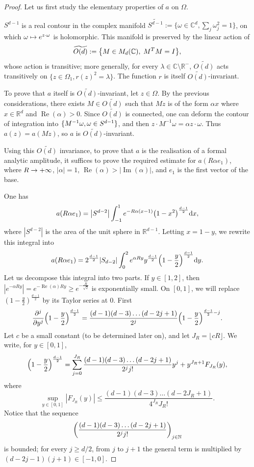 \documentclass[10pt]{amsart}
\theoremstyle{definition}\newtheorem{defi}[theo]{Definition}\newtheorem{rema}[theo]{Remark}\newtheorem{exam}[theo]{Example}\newtheorem{exem}[theo]{Example}\newtheorem{nota}[theo]{Notation}
\DeclareMathOperator{\re}{Re}
\DeclareMathOperator{\im}{Im}
\newcommand\1{\mathds{1}}
\newcommand{\R}{\mathbb{R}}
\newcommand{\C}{\mathbb{C}}
\newcommand{\N}{\mathbb{N}}
\newcommand{\dd}{\mathrm{d}}
\renewcommand*{\to}{\mathchoice{\longrightarrow}{\rightarrow}{\rightarrow}{\rightarrow}}
\let\oldmapsto\mapsto
\renewcommand*{\mapsto}{\mathchoice{\longmapsto}{\oldmapsto}{\oldmapsto}{\oldmapsto}}
\let\originalleft\left
\let\originalright\right
\renewcommand{\left}{\mathopen{}\mathclose\bgroup\originalleft}
\renewcommand{\right}{\aftergroup\egroup\originalright}
\begin{document}
\begin{proof}
Let us first study the elementary properties of $a$ on $\Omega$.

$S^{d-1}$ is a real contour in the complex manifold $\widetilde{S^{d-1}}:=\{\omega\in \C^d,
\sum_j \omega_j^2=1\}$, on which $\omega\mapsto e^{z\cdot \omega}$ is holomorphic. This manifold is preserved by the linear action of
\[
\widetilde{O(d)}:=\left\{M\in M_d(\C),\; M^TM=I\right\},
\]
whose action is transitive; more generally, for every $\lambda\in
\C\setminus \R^-$, $\widetilde{O(d)}$ acts transitively on $\{z\in \Omega_1, r(z)^2=\lambda\}$. The function $r$ is itself $\widetilde{O(d)}$-invariant.


To prove that $a$ itself is $\widetilde{O(d)}$-invariant, let $z\in \Omega$. By the previous considerations, there exists $M\in \widetilde{O(d)}$ such that $Mz$ is of the form $\alpha x$ where $x\in \R^{d}$ and $\re(\alpha)>0$. Since $\widetilde{O(d)}$ is connected, one can deform the contour of integration into $\{M^{-1}\omega,\linebreak \omega\in S^{d-1}\}$, and then $z\cdot M^{-1}\omega=\alpha z\cdot \omega$. Thus $a(z)=a(Mz)$, so $a$ is $\widetilde{O(d)}$-invariant.

Using this $\widetilde{O(d)}$ invariance, to prove that $a$ is the realisation of a formal analytic amplitude, it suffices to prove the required estimate for $a(R\alpha e_1)$, where $R\to +\infty$, $|\alpha|=1$, $\re(\alpha)>\lvert\im(\alpha)|$, and $e_1$ is the first vector of the base.

One has
\[
a(R\alpha e_1)=\left|S^{d-2}\right|\int_{-1}^1 e^{-R\alpha (x-1)}\left(1-x^2\right)^{\frac{d-1}{2}}\dd x,
\]
where $|S^{d-2}|$ is the area of the unit sphere in $\R^{d-1}$. Letting $x=1-y$, we rewrite this integral into
\[
a(R\alpha e_1)=2^{\frac{d-1}{2}}|S_{d-2}|\int_{0}^{2} e^{\alpha R y}y^{\frac{d-1}{2}}\left(1-\frac{y}{2}\right)^{\frac{d-1}{2}}\dd y.
\]
Let us decompose this integral into two parts. If $y\in [1,2]$, then $|e^{-\alpha Ry}|=e^{-\re(\alpha)Ry}\geq e^{-\frac{R}{\sqrt{2}}}$ is exponentially small. On $[0,1]$, we will replace $(1-\frac{y}{2})^{\frac{d-1}{2}}$ by its Taylor series at $0$. First
\[
\frac{\partial^j}{\partial y^j}\left(1-\frac{y}{2}\right)^{\frac{d-1}{2}}=\frac{(d-1)(d-3)\dots(d-2j+1)}{2^j}\left(1-\frac{y}{2}\right)^{\frac{d-1}{2}-j}.
\]
Let $c$ be a small constant (to be determined later on), and let $J_R=\lfloor cR\rfloor$. We write, for $y\in [0,1]$,
\[
\left(1-\frac{y}{2}\right)^{\frac{d-1}{2}}=\sum_{j=0}^{J_R}\frac{(d-1)(d-3)\dots(d-2j+1)}{2^jj!}y^j+y^{J_R+1}F_{J_R}(y),
\]
where
\[
\sup_{y\in [0,1]}|F_{J_R}(y)|\leq
\frac{(d-1)(d-3)\dots(d-2J_R+1)}{4^{J_R}J_R!}.
\]
Notice that the sequence
\[
\left(\frac{(d-1)(d-3)\dots(d-2j+1)}{2^jj!}\right)_{j\in \N}
\]
is bounded; for every $j\geq d/2$, from $j$ to $j+1$ the general term is multiplied by $(d-2j-1)(j+1)\in [-1,0]$.


\end{proof}
\end{document}
